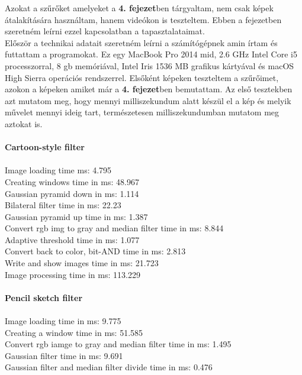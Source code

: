 
\label{chap:tests}

Azokat a szűrőket amelyeket a \textbf{4. fejezet}ben tárgyaltam, nem csak képek átalakítására használtam, hanem videókon is teszteltem. Ebben a fejezetben szeretném leírni ezzel kapcsolatban a tapasztalataimat. 
\\

\noindent Először a technikai adatait szeretném leírni a számítógépnek amin írtam és futtattam a programokat. Ez egy MacBook Pro  2014 mid, 2.6 GHz Intel Core i5 processzorral, 8 gb memóriával, Intel Iris 1536 MB grafikus kártyával és macOS High Sierra operációs rendszerrel.
Elsőként képeken teszteltem a szűrőimet, azokon a képeken amiket már a \textbf{4. fejezet}ben bemutattam. Az első tesztekben azt mutatom meg, hogy mennyi milliszekundum alatt készül el a kép és melyik művelet mennyi ideig tart, természetesen milliszekundumban mutatom meg aztokat is.\\\\
\textbf{Cartoon-style filter}\\\\
Image loading time ms: 4.795\\
Creating windows time in ms: 48.967\\
Gaussian pyramid down in ms: 1.114\\
Bilateral filter time in ms: 22.23\\
Gaussian pyramid up time in ms: 1.387\\
Convert rgb img to gray and median filter  time in ms: 8.844\\
Adaptive threshold time in ms: 1.077\\
Convert back to color, bit-AND time in ms: 2.813\\
Write and show images time in ms: 21.723\\
Image processing time in ms: 113.229\\\\
\textbf{Pencil sketch filter}\\\\
Image loading time in ms: 9.775\\
Creating a window time in ms: 51.585\\
Convert rgb iamge to gray and median filter time in ms: 1.495\\
Gaussian filter time in ms: 9.691\\
Gaussian filter and median filter divide time in ms: 0.476\\
